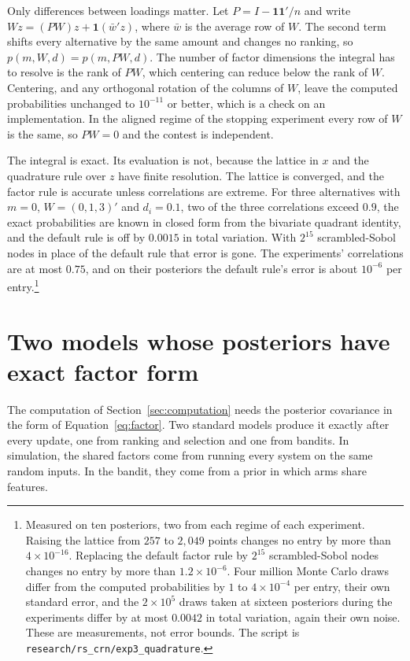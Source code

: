 \documentclass[11pt]{article}
\begin{document}
Only differences between loadings matter. Let $P = I - \mathbf{1}
\mathbf{1}'/n$ and write $W z = (PW) z + \mathbf{1}(\bar{w}' z)$,
where $\bar{w}$ is the average row of $W$. The second term shifts
every alternative by the same amount and changes no ranking, so
$p(m, W, d) = p(m, PW, d)$. The number of factor dimensions the
integral has to resolve is the rank of $PW$, which centering can
reduce below the rank of $W$. Centering, and any orthogonal rotation
of the columns of $W$, leave the computed probabilities unchanged to
$10^{-11}$ or better, which is a check on an implementation. In the
aligned regime of the stopping experiment every row of $W$ is the
same, so $PW = 0$ and the contest is independent.

The integral is exact. Its evaluation is not, because the lattice in
$x$ and the quadrature rule over $z$ have finite resolution. The
lattice is converged, and the factor rule is accurate unless
correlations are extreme. For three alternatives with $m = 0$,
$W = (0, 1, 3)'$ and $d_i = 0.1$, two of the three correlations
exceed $0.9$, the exact probabilities are known in closed form from the
bivariate quadrant identity, and the default rule is off by $0.0015$
in total variation. With $2^{15}$ scrambled-Sobol nodes in place of
the default rule that error is gone. The experiments' correlations
are at most $0.75$, and on their posteriors the default rule's error
is about $10^{-6}$ per entry.\footnote{Measured on ten posteriors,
two from each regime of each experiment. Raising the lattice from
$257$ to $2{,}049$ points changes no entry by more than
$4 \times 10^{-16}$. Replacing the default factor rule by $2^{15}$
scrambled-Sobol nodes changes no entry by more than
$1.2 \times 10^{-6}$. Four million Monte Carlo draws differ from the computed probabilities by $1$ to $4 \times 10^{-4}$ per entry, their own
standard error, and the $2 \times 10^5$ draws taken at sixteen
posteriors during the experiments differ by at most $0.0042$ in total
variation, again their own noise. These are measurements, not error
bounds. The script is \texttt{research/rs\_crn/exp3\_quadrature}.}

\section{Two models whose posteriors have exact factor form}
\label{sec:posteriors}

The computation of Section~\ref{sec:computation} needs the posterior
covariance in the form of Equation~\eqref{eq:factor}. Two standard models produce it exactly after every update, one from
ranking and selection and one from bandits. In simulation, the shared factors come from running every
system on the same random inputs. In the bandit, they come from a
prior in which arms share features.
\end{document}
